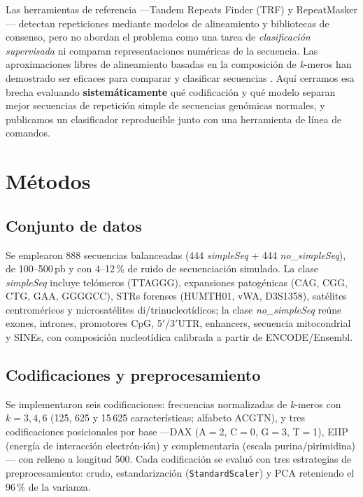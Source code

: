 \documentclass[twocolumn,10pt]{article}
\begin{document}
Las herramientas de referencia ---Tandem Repeats Finder (TRF) \cite{benson1999} y RepeatMasker
\cite{repeatmasker}--- detectan repeticiones mediante modelos de alineamiento y bibliotecas de
consenso, pero no abordan el problema como una tarea de \emph{clasificación supervisada} ni comparan
representaciones numéricas de la secuencia. Las aproximaciones libres de alineamiento basadas en la
composición de \textit{k}-meros han demostrado ser eficaces para comparar y clasificar secuencias
\cite{vinga2003,wood2014}. Aquí cerramos esa brecha evaluando \textbf{sistemáticamente} qué
codificación y qué modelo separan mejor secuencias de repetición simple de secuencias genómicas
normales, y publicamos un clasificador reproducible junto con una herramienta de línea de comandos.

\section{Métodos}
\subsection{Conjunto de datos}
Se emplearon 888 secuencias balanceadas (444 \textit{simpleSeq} + 444 \textit{no\_simpleSeq}), de
100--500\,pb y con 4--12\,\% de ruido de secuenciación simulado. La clase \textit{simpleSeq} incluye
telómeros (TTAGGG), expansiones patogénicas (CAG, CGG, CTG, GAA, GGGGCC), STRs forenses (HUMTH01,
vWA, D3S1358), satélites centroméricos y microsatélites di/trinucleotídicos; la clase
\textit{no\_simpleSeq} reúne exones, intrones, promotores CpG, 5$'$/3$'$UTR, enhancers, secuencia
mitocondrial y SINEs, con composición nucleotídica calibrada a partir de ENCODE/Ensembl.

\subsection{Codificaciones y preprocesamiento}
Se implementaron seis codificaciones: frecuencias normalizadas de \textit{k}-meros con $k=3,4,6$
(125, 625 y 15\,625 características; alfabeto ACGTN), y tres codificaciones posicionales por base
---DAX (A$=$2, C$=$0, G$=$3, T$=$1), EIIP (energía de interacción electrón-ión) y complementaria
(escala purina/pirimidina)--- con relleno a longitud 500. Cada codificación se evaluó con tres
estrategias de preprocesamiento: crudo, estandarización (\texttt{StandardScaler}) y PCA reteniendo
el 96\,\% de la varianza.
\end{document}
